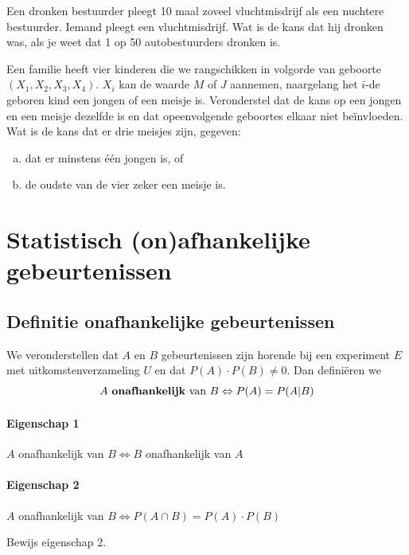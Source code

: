 \documentclass[12pt,twoside]{article}
\begin{document}
\begin{oefening}
Een dronken bestuurder pleegt 10 maal zoveel vluchtmisdrijf als een nuchtere bestuurder. Iemand pleegt een vluchtmisdrijf. Wat is de kans dat hij dronken was, als je weet dat 1 op 50 autobestuurders dronken is.
\end{oefening}

\begin{oefening}
Een familie heeft vier kinderen die we rangschikken in volgorde van geboorte $(X_1, X_2, X_3, X_4)$. $X_i$ kan de waarde $M$ of $J$ aannemen, naargelang het $i$-de geboren kind een jongen of een meisje is. Veronderstel dat de kans op een jongen en een meisje dezelfde is en dat opeenvolgende geboortes elkaar niet beïnvloeden. Wat is de kans dat er drie meisjes zijn, gegeven:
\begin{enumerate}[(a)]
  \item dat er minstens één jongen is, of
  \item de oudste van de vier zeker een meisje is.
\end{enumerate}
\end{oefening}

\pagebreak
\section{Statistisch (on)afhankelijke gebeurtenissen}

\subsection{Definitie onafhankelijke gebeurtenissen}

We veronderstellen dat $A$ en $B$ gebeurtenissen zijn horende bij een experiment $E$ met uitkomstenverzameling $U$ en dat $P(A)\cdot P(B) \neq 0$. Dan definiëren we
$$A \mbox{ {\bf onafhankelijk} van } B \Leftrightarrow P(A)=P(A|B)$$

\paragraph*{Eigenschap 1} $A$ onafhankelijk van $B \Leftrightarrow B$ onafhankelijk van $A$

\paragraph*{Eigenschap 2} $A$ onafhankelijk van $B \Leftrightarrow P(A\cap B)=P(A)\cdot P(B)$

\begin{oefening}
Bewijs eigenschap 2.
\end{oefening}
\end{document}
